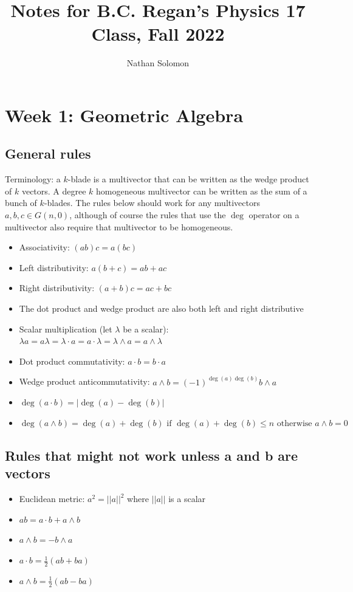\documentclass[12pt]{article}
\begin{document}
\title{Notes for B.C. Regan's Physics 17 Class, Fall 2022}
\author{Nathan Solomon}
\maketitle

\tableofcontents

\section{Week 1: Geometric Algebra}

\subsection{General rules}
Terminology: a $k$-blade is a multivector that can be written as the wedge product of $k$ vectors. A degree $k$ homogeneous multivector can be written as the sum of a bunch of $k$-blades. The rules below should work for any multivectors $a, b, c \in G(n, 0)$, although of course the rules that use the $\deg$ operator on a multivector also require that multivector to be homogeneous.
\begin{itemize}
    \item Associativity: $(ab)c = a(bc)$
    \item Left distributivity: $a(b+c) = ab+ac$
    \item Right distributivity: $(a+b)c = ac+bc$
    \item The dot product and wedge product are also both left and right distributive
    \item Scalar multiplication (let $\lambda$ be a scalar): $\lambda a = a \lambda = \lambda \cdot a = a \cdot \lambda = \lambda \wedge a = a \wedge \lambda$
    \item Dot product commutativity: $a \cdot b = b \cdot a$
    \item Wedge product anticommutativity: $a \wedge b = (-1)^{\deg(a) \deg(b)} b \wedge a$
    \item $\deg(a \cdot b) = | \deg(a) - \deg(b) |$
    \item $\deg(a \wedge b) = \deg(a) + \deg(b) \text{ if } \deg(a) + \deg(b) \leq n \text{ otherwise } a \wedge b = 0$
\end{itemize}

\subsection{Rules that might not work unless a and b are vectors}
\begin{itemize}
    \item Euclidean metric: $a^2 = ||a||^2$ where $||a||$ is a scalar
    \item $ab = a \cdot b + a \wedge b$
    \item $a \wedge b = - b \wedge a$
    \item $a \cdot b = \frac{1}{2}(ab + ba)$
    \item $a \wedge b = \frac{1}{2} (ab - ba)$
\end{itemize}
\end{document}
